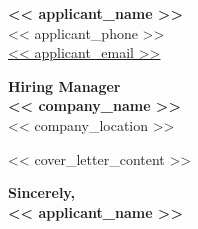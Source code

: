 \documentclass[letterpaper,11pt]{article}
\begin{document}
\begin{flushleft}
    {\Huge \textbf{<< applicant_name >>}} \\ \vspace{2pt}
    << applicant_phone >> \\
    \href{mailto:<< applicant_email >>}{ << applicant_email >> }
\end{flushleft}

\vspace{1cm}

\begin{flushleft}
    \textbf{Hiring Manager} \\
    \textbf{<< company_name >>} \\
    << company_location >>
\end{flushleft}

\vspace{0.5cm}

<< cover_letter_content >>

\vspace{1cm}

\textbf{Sincerely,} \\
\textbf{<< applicant_name >>}
\end{document}
